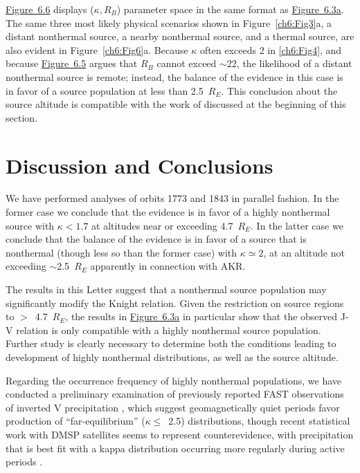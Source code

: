   \hyperref[ch6:Fig6]{Figure~6.6} displays ($\kappa, R_B$) parameter
  space in the same format as \hyperref[ch6:Fig3]{Figure~6.3a}. The
  same three most likely physical scenarios shown in
  Figure~\ref{ch6:Fig3}a, a distant nonthermal source, a nearby
  nonthermal source, and a thermal source, are also evident in
  Figure~\ref{ch6:Fig6}a. Because $\kappa$ often exceeds 2 in
  \ref{ch6:Fig4}, and because \hyperref[ch6:Fig5]{Figure~6.5} argues
  that $R_B$ cannot exceed $\sim$22, the likelihood of a distant
  nonthermal source is remote; instead, the balance of the evidence in
  this case is in favor of a source population at less than
  2.5~$R_E$. This conclusion about the source altitude is compatible
  with the work of \citet{Ergun1998} discussed at the beginning of
  this section.


  \section{Discussion and Conclusions}

  We have performed analyses of orbits 1773 and 1843 in parallel
  fashion. In the former case we conclude that the evidence is in
  favor of a highly nonthermal source with $\kappa < 1.7$ at altitudes
  near or exceeding 4.7~$R_E$. In the latter case we conclude that the
  balance of the evidence is in favor of a source that is nonthermal
  (though less so than the former case) with $\kappa \simeq 2$, at an
  altitude not exceeding $\sim$2.5~$R_E$ apparently in connection with
  AKR.

  The results in this Letter suggest that a nonthermal source
  population may significantly modify the Knight relation. Given the
  restriction on source regions to $>$~4.7~$R_E$, the results in
  \hyperref[ch6:Fig3]{Figure~6.3a} in particular show that the observed J-V
  relation is only compatible with a highly nonthermal source
  population. Further study is clearly necessary to determine both the
  conditions leading to development of highly nonthermal
  distributions, as well as the source altitude.

  Regarding the occurrence frequency of highly nonthermal populations,
  we have conducted a preliminary examination of previously reported
  FAST observations of inverted V precipitation
  \citep{McFadden1998a,Carlson2001,Janhunen2001,Dombeck2013}, which
  suggest geomagnetically quiet periods favor production of
  ``far-equilibrium'' ($\kappa \leq$~2.5) distributions, though recent
  statistical work with DMSP satellites seems to represent
  counterevidence, with precipitation that is best fit with a kappa
  distribution occurring more regularly during active periods
  \citep[e.g., Figure~7 in][]{McIntosh2014}.

